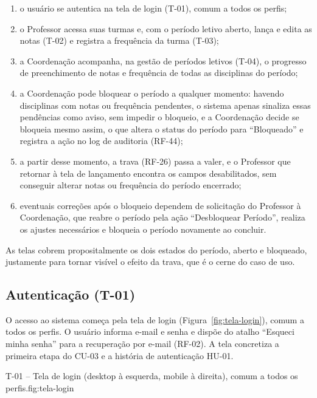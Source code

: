 \begin{enumerate}
    \item o usuário se autentica na tela de login (T-01), comum a todos os
    perfis;
    \item o Professor acessa suas turmas e, com o período letivo aberto,
    lança e edita as notas (T-02) e registra a frequência da turma (T-03);
    \item a Coordenação acompanha, na gestão de períodos letivos (T-04), o
    progresso de preenchimento de notas e frequência de todas as disciplinas do
    período;
    \item a Coordenação pode bloquear o período a qualquer momento: havendo
    disciplinas com notas ou frequência pendentes, o sistema apenas sinaliza
    essas pendências como aviso, sem impedir o bloqueio, e a Coordenação
    decide se bloqueia mesmo assim, o que altera o status do período para
    ``Bloqueado'' e registra a ação no log de auditoria (RF-44);
    \item a partir desse momento, a trava (RF-26) passa a valer, e o Professor
    que retornar à tela de lançamento encontra os campos desabilitados, sem
    conseguir alterar notas ou frequência do período encerrado;
    \item eventuais correções após o bloqueio dependem de solicitação do
    Professor à Coordenação, que reabre o período pela ação ``Desbloquear
    Período'', realiza os ajustes necessários e bloqueia o período novamente
    ao concluir.
\end{enumerate}

As telas cobrem propositalmente os dois estados do período, aberto e bloqueado,
justamente para tornar visível o efeito da trava, que é o cerne do caso de uso.

\subsection{Autenticação (T-01)}

O acesso ao sistema começa pela tela de login (Figura~\ref{fig:tela-login}),
comum a todos os perfis. O usuário informa e-mail e senha e dispõe do atalho
``Esqueci minha senha'' para a recuperação por e-mail (RF-02). A tela concretiza
a primeira etapa do CU-03 e a história de autenticação HU-01.

%
{T-01 -- Tela de login (desktop à esquerda, mobile à direita), comum a todos os perfis.}{fig:tela-login}

